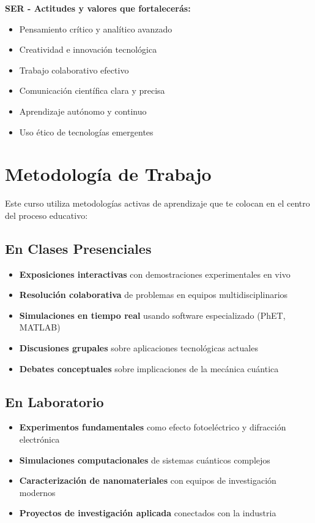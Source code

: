 \begin{tecnologiabox}
\begin{tecnologiabox}
\begin{tecnologiabox}
\begin{teknologiabox}
\begin{tecnologiabox}
\begin{tecnologiabox}
\begin{tecnologiabox}
\begin{serbox}
\textbf{SER - Actitudes y valores que fortalecerás:}
\begin{itemize}
	\item Pensamiento crítico y analítico avanzado
	\item Creatividad e innovación tecnológica
	\item Trabajo colaborativo efectivo
	\item Comunicación científica clara y precisa
	\item Aprendizaje autónomo y continuo
	\item Uso ético de tecnologías emergentes
\end{itemize}
\end{serbox}

\section{Metodología de Trabajo}

Este curso utiliza metodologías activas de aprendizaje que te colocan en el centro del proceso educativo:

\subsection{En Clases Presenciales}

\begin{itemize}
\item \textbf{Exposiciones interactivas} con demostraciones experimentales en vivo
\item \textbf{Resolución colaborativa} de problemas en equipos multidisciplinarios
\item \textbf{Simulaciones en tiempo real} usando software especializado (PhET, MATLAB)
\item \textbf{Discusiones grupales} sobre aplicaciones tecnológicas actuales
\item \textbf{Debates conceptuales} sobre implicaciones de la mecánica cuántica
\end{itemize}

\subsection{En Laboratorio}

\begin{itemize}
\item \textbf{Experimentos fundamentales} como efecto fotoeléctrico y difracción electrónica
\item \textbf{Simulaciones computacionales} de sistemas cuánticos complejos
\item \textbf{Caracterización de nanomateriales} con equipos de investigación modernos
\item \textbf{Proyectos de investigación aplicada} conectados con la industria
\end{itemize}


\end{tecnologiabox}
\end{tecnologiabox}
\end{tecnologiabox}
\end{teknologiabox}
\end{tecnologiabox}
\end{tecnologiabox}
\end{tecnologiabox}
